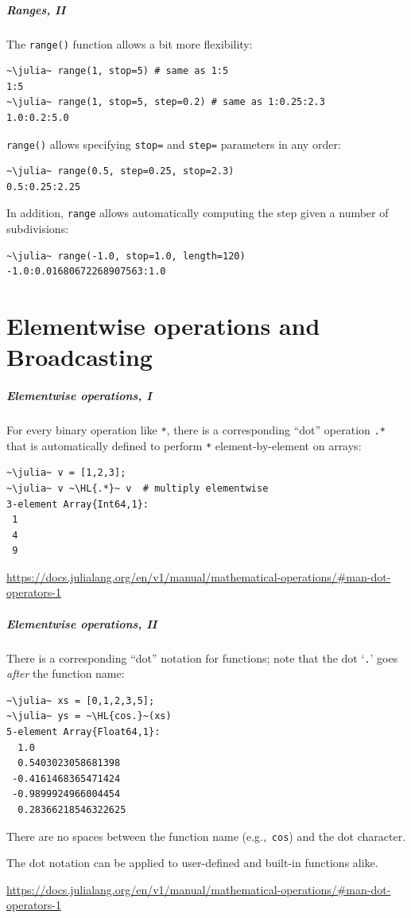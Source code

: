 \documentclass[english,serif,mathserif,xcolor=pdftex,dvipsnames,table]{beamer}
\begin{document}
\begin{frame}[fragile]
  \frametitle{Ranges, II}
  The \texttt{range()} function allows a bit more flexibility:
\begin{lstlisting}
~\julia~ range(1, stop=5) # same as 1:5
1:5
~\julia~ range(1, stop=5, step=0.2) # same as 1:0.25:2.3
1.0:0.2:5.0
\end{lstlisting}

  \texttt{range()} allows specifying \texttt{stop=} and \texttt{step=}
  parameters in any order:
\begin{lstlisting}
~\julia~ range(0.5, step=0.25, stop=2.3)
0.5:0.25:2.25
\end{lstlisting}

  In addition, \texttt{range} allows automatically computing the step
  given a number of subdivisions:
\begin{lstlisting}
~\julia~ range(-1.0, stop=1.0, length=120)
-1.0:0.01680672268907563:1.0
\end{lstlisting}
\end{frame}


\part{Elementwise operations and Broadcasting}
\begin{frame}
  \frametitle{Elementwise operations, I}
  For every binary operation like \texttt{*}, there is a corresponding ``dot''
  operation \texttt{.*} that is automatically defined to perform \texttt{*}
  element-by-element on arrays:
\begin{lstlisting}
~\julia~ v = [1,2,3];
~\julia~ v ~\HL{.*}~ v  # multiply elementwise
3-element Array{Int64,1}:
 1
 4
 9
\end{lstlisting}

  \+
  \begin{references}
    \url{https://docs.julialang.org/en/v1/manual/mathematical-operations/#man-dot-operators-1}
  \end{references}
\end{frame}

\begin{frame}[fragile]
  \frametitle{Elementwise operations, II}
  There is a corresponding ``dot'' notation for functions;
  note that the dot `\texttt{.}' goes \emph{after} the function name:
\begin{lstlisting}
~\julia~ xs = [0,1,2,3,5];
~\julia~ ys = ~\HL{cos.}~(xs)
5-element Array{Float64,1}:
  1.0
  0.5403023058681398
 -0.4161468365471424
 -0.9899924966004454
  0.28366218546322625
\end{lstlisting}
  There are no spaces between the function name (e.g.,~\texttt{cos})
  and the dot character.

  \+
  The dot notation can be applied to user-defined and built-in
  functions alike.

  \+
  \begin{references}
    \url{https://docs.julialang.org/en/v1/manual/mathematical-operations/#man-dot-operators-1}
  \end{references}
\end{frame}
\end{document}
